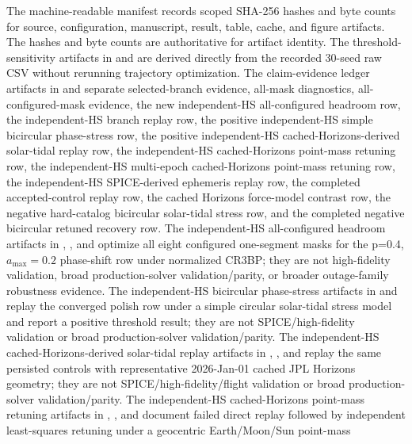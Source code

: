 \documentclass[11pt]{article}
\begin{document}
The machine-readable manifest  records scoped SHA-256 hashes and byte counts for source, configuration, manuscript, result, table, cache, and figure artifacts. The hashes and byte counts are authoritative for artifact identity. The threshold-sensitivity artifacts in  and  are derived directly from the recorded 30-seed raw CSV without rerunning trajectory optimization. The claim-evidence ledger artifacts in  and  separate selected-branch evidence, all-mask diagnostics, all-configured-mask evidence, the new independent-HS all-configured headroom row, the independent-HS branch replay row, the positive independent-HS simple bicircular phase-stress row, the positive independent-HS cached-Horizons-derived solar-tidal replay row, the independent-HS cached-Horizons point-mass retuning row, the independent-HS multi-epoch cached-Horizons point-mass retuning row, the independent-HS SPICE-derived ephemeris replay row, the completed accepted-control replay row, the cached Horizons force-model contrast row, the negative hard-catalog bicircular solar-tidal stress row, and the completed negative bicircular retuned recovery row. The independent-HS all-configured headroom artifacts in , , and  optimize all eight configured one-segment masks for the p=0.4, $a_{\max}=0.2$ phase-shift row under normalized CR3BP; they are not high-fidelity validation, broad production-solver validation/parity, or broader outage-family robustness evidence. The independent-HS bicircular phase-stress artifacts in  and  replay the converged polish row under a simple circular solar-tidal stress model and report a positive threshold result; they are not SPICE/high-fidelity validation or broad production-solver validation/parity. The independent-HS cached-Horizons-derived solar-tidal replay artifacts in , , and  replay the same persisted controls with representative 2026-Jan-01 cached JPL Horizons geometry; they are not SPICE/high-fidelity/flight validation or broad production-solver validation/parity. The independent-HS cached-Horizons point-mass retuning artifacts in , , and  document failed direct replay followed by independent least-squares retuning under a geocentric Earth/Moon/Sun point-mass 
\end{document}

